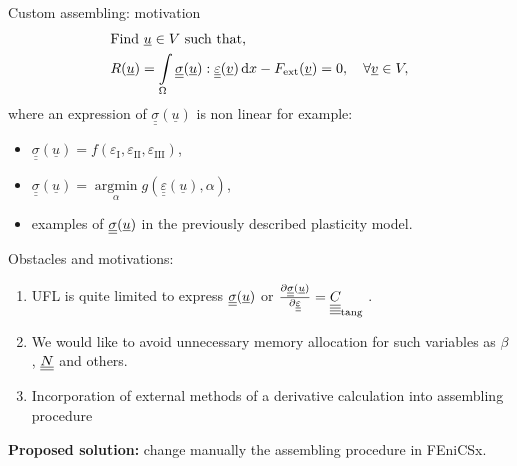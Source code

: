 \documentclass[9pt]{beamer}
\begin{document}
\begin{frame}{Custom assembling: motivation}
  \begin{align}
    & \text{Find } \underline{u} \in V \text{ such that,} \label{eqn:var_from_1} \\ 
    & R(\underline{u}) = \int\limits_\Omega\underline{\underline{\sigma}}(\underline{u}) : \underline{\underline{\varepsilon}}(\underline{v}) \, \mathrm{d} x - F_\text{ext}(\underline{v}) = 0, \quad \forall \underline{v} \in V \label{eqn:var_from_2},
  \end{align}
  where an expression of $\underline{\underline{\sigma}}(\underline{u})$ is non linear for example:
  \begin{itemize}
    \item $\underline{\underline{\sigma}}(\underline{u}) = f(\varepsilon_\text{I}, \varepsilon_\text{II}, \varepsilon_\text{III})$,
    \item $\underline{\underline{\sigma}}(\underline{u}) = \underset{\alpha}{\operatorname{argmin}} g(\underline{\underline{\varepsilon}}(\underline{u}),  \alpha)$,
    \item examples of $\underline{\underline{\sigma}}(\underline{u})$ in the previously described plasticity model.
  \end{itemize}

  Obstacles and motivations:
  \begin{enumerate}
    \item UFL is quite limited to express $\underline{\underline{\sigma}}(\underline{u})$ or $\frac{\partial\underline{\underline{\sigma}}(\underline{u})}{\partial\underline{\underline{\varepsilon}}} = \underline{\underline{\underline{\underline{C_{}}}}}_\text{tang}$ .
    \item We would like to avoid unnecessary memory allocation for such variables as $\beta$, $\underline{\underline{N}}$ and others.
    \item Incorporation of external methods of a derivative calculation into assembling procedure
  \end{enumerate}

  \textbf{Proposed solution:} change manually the assembling procedure in FEniCSx.
\end{frame}
\end{document}
